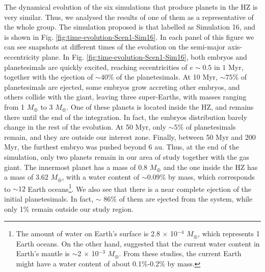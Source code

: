 \documentclass{aa}
\begin{document}
The dynamical evolution of the six simulations that produce planets in the HZ is very similar. Thus, we analysed the results of
one of them as a representative of the whole group. The simulation proposed is that labelled as Simulation 16, and is shown in
Fig. \ref{fig:time-evolution-Scen1-Sim16}. In each panel of this figure we can see snapshots at different times of
the evolution on the semi-major axis-eccentricity plane.
In Fig. \ref{fig:time-evolution-Scen1-Sim16}, both embryos and planetesimals are quickly excited, reaching eccentricities of $e \sim 0.5$
in $1$ Myr, together with the ejection of $\sim 40\%$ of the planetesimals. At 10 Myr, $\sim 75\%$ of planetesimals are ejected, some
embryos grow accreting other embryos, and others collide with the giant, leaving three super-Earths, with masses ranging from 1 $M_\oplus$
to 3 $M_\oplus$.
One of these planets is located inside the HZ, and remains there until the end of the integration. In fact, the embryos distribution
barely change in the rest of the evolution.
At 50 Myr, only $\sim 5\%$ of planetesimals remain, and they are outside our interest zone. Finally, between 50 Myr and 200
Myr, the furthest embryo was pushed beyond $6$ au. Thus, at the end of the simulation, only two planets remain in our area of study together with the gas giant.
The innermost planet has a mass of $0.8$ $M_\oplus$ and the one inside the HZ has a mass of 3.62 $M_\oplus$, with a water content of 
$\sim 0.09\%$ by mass, which corresponds to $\sim 12$ Earth oceans\footnote{The amount of water on Earth's surface is 2.8
$\times$ 10$^{-4}$ $M_{\oplus}$, which represents 1 Earth oceans. On the other hand, \citet{Marty2012} suggested that the
current water content in Earth's mantle is $\sim$2 $\times$ 10$^{-3}$ $M_{\oplus}$. From these studies, the current Earth might have
a water content of about 0.1\%-0.2\% by mass.}. We also see that there is a near complete ejection of the initial planetesimals. In fact, $\sim$ 86$\%$
of them are ejected from the system, while only 1$\%$ remain outside our study region.

\end{document}
